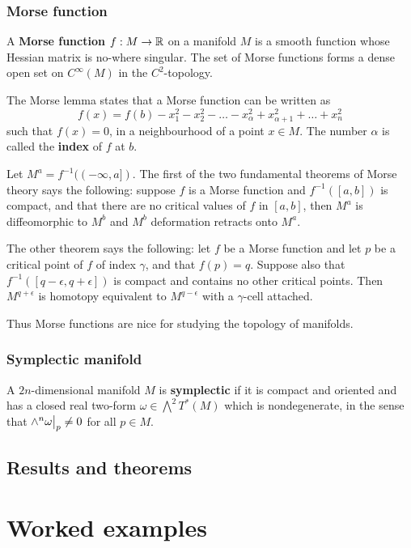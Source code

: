 \documentclass[11pt, english]{article}
\begin{document}
\subsubsection{Morse function}
\label{morsefunction}

A \textbf{Morse function} $f:M \to \mathbb{R}$ on a manifold $M$ is a smooth function whose Hessian matrix is no-where singular. The set of Morse functions forms a dense open set on $C^\infty(M)$ in the $C^2$-topology.

The Morse lemma states that a Morse function can be written as
$$
f(x)=f(b)- x_1^2-x_2^2-\ldots-x_\alpha^2+x_{\alpha+1}^2+\ldots+x_n^2
$$
such that $f(x)=0$, in a neighbourhood of a point $x \in M$. The number $\alpha$ is called the \textbf{index} of $f$ at $b$. 

Let $M^a=f^{-1}((-\infty,a])$. The first of the two fundamental theorems of Morse theory says the following: suppose $f$ is a Morse function and $f^{-1}([a,b])$ is compact, and that there are no critical values of $f$ in $[a,b]$, then $M^a$ is diffeomorphic to $M^b$ and $M^b$ deformation retracts onto $M^a$.

The other theorem says the following: let $f$ be a Morse function and let $p$ be a critical point of $f$ of index $\gamma$, and that $f(p)=q$. Suppose also that $f^{-1}([q-\epsilon,q+\epsilon])$ is compact and contains no other critical points. Then $M^{q+\epsilon}$ is homotopy equivalent to $M^{q-\epsilon}$ with a $\gamma$-cell attached.

Thus Morse functions are nice for studying the topology of manifolds.

\subsubsection{Symplectic manifold}
\label{symplectic}

A $2n$-dimensional manifold $M$ is \textbf{symplectic} if it is compact and oriented and has a closed real two-form $\omega \in \bigwedge^2 T^\ast(M)$ which is nondegenerate, in the sense that $\restr{\wedge^n \omega}{p} \neq 0$ for all $p \in M$.

\subsection{Results and theorems}

\section{Worked examples}
\end{document}

